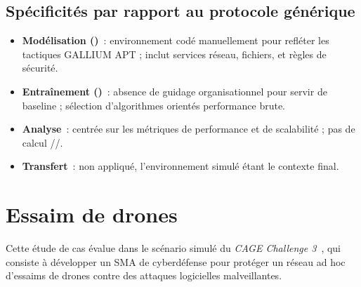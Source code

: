 \subsection{Spécificités par rapport au protocole générique}
\begin{itemize}
  \item \textbf{Modélisation ()}~: environnement codé manuellement pour refléter les tactiques GALLIUM APT ; inclut services réseau, fichiers, et règles de sécurité.
  \item \textbf{Entraînement ()}~: absence de guidage organisationnel pour servir de baseline ; sélection d’algorithmes orientés performance brute.
  \item \textbf{Analyse}~: centrée sur les métriques de performance et de scalabilité ; pas de calcul //.
  \item \textbf{Transfert}~: non appliqué, l’environnement simulé étant le contexte final.
\end{itemize}


\section{Essaim de drones}
\label{sec:drone_swarm}

Cette étude de cas évalue  dans le scénario simulé du \textit{CAGE Challenge 3}~\cite{cage_challenge_3_announcement}, qui consiste à développer un SMA de cyberdéfense pour protéger un réseau ad hoc d’essaims de drones contre des attaques logicielles malveillantes.

